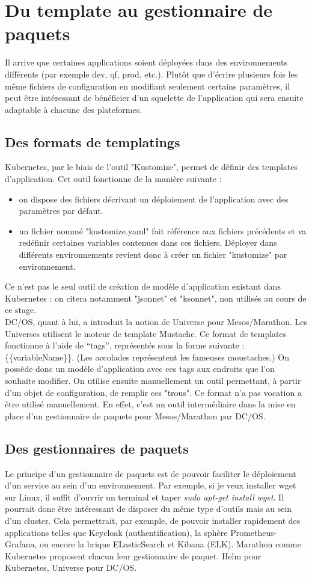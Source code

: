 \documentclass[11pt,fleqn]{book} %
\begin{document}
\section{Du template au gestionnaire de paquets}
Il arrive que certaines applications soient déployées dans des environnements différents (par exemple dev, qf, prod, etc.). Plutôt que d'écrire plusieurs fois les même fichiers de configuration en modifiant seulement certains paramètres, il peut être intéressant de bénéficier d'un squelette de l'application qui sera ensuite adaptable à chacune des plateformes.
\subsection{Des formats de templatings}
Kubernetes, par le biais de l'outil "Kustomize", permet de définir des templates d'application. Cet outil fonctionne de la manière suivante :
\begin{itemize}
    \item on dispose des fichiers décrivant un déploiement de l'application avec des paramètres par défaut.
    \item un fichier nommé "kustomize.yaml"  fait référence aux fichiers précédents et va redéfinir certaines variables contenues dans ces fichiers.
    Déployer dans différents environnements revient donc à créer un fichier "kustomize" par environnement.
\end{itemize}
Ce n'est pas le seul outil de création de modèle d'application existant dans Kubernetes : on citera notamment "jsonnet" et "ksonnet", non utilisés au cours de ce stage.\\ 

DC/OS, quant à lui, a introduit la notion de Universe pour Mesos/Marathon. Les Universes utilisent le moteur de template Mustache. 
Ce format de templates fonctionne à l’aide de “tags”, représentés sous la forme suivante : \{\{variableName\}\}. (Les accolades représentent les fameuses moustaches.) On possède donc un modèle d'application avec ces tags aux endroits que l'on souhaite modifier. On utilise ensuite manuellement un outil permettant, à partir d'un objet de configuration, de remplir ces "trous". Ce format n'a pas vocation a être utilisé manuellement. En effet, c'est un outil intermédiaire dans la mise en place d'un gestionnaire de paquets pour Mesos/Marathon par DC/OS.


\subsection{Des gestionnaires de paquets}
Le principe d'un gestionnaire de paquets est de pouvoir faciliter le déploiement d'un service au sein d'un environnement. Par exemple, si je veux installer wget sur Linux, il suffit d'ouvrir un terminal et taper \textit{sudo apt-get install wget}. Il pourrait donc être intéressant de disposer du même type d'outils mais au sein d'un cluster. Cela permettrait, par exemple, de pouvoir installer rapidement des applications telles que Keycloak (authentification), la sphère Prometheus-Grafana, ou encore la brique ELasticSearch et Kibana (ELK). Marathon comme Kubernetes proposent chacun leur gestionnaire de paquet. Helm pour Kubernetes, Universe pour DC/OS. \\
\end{document}
